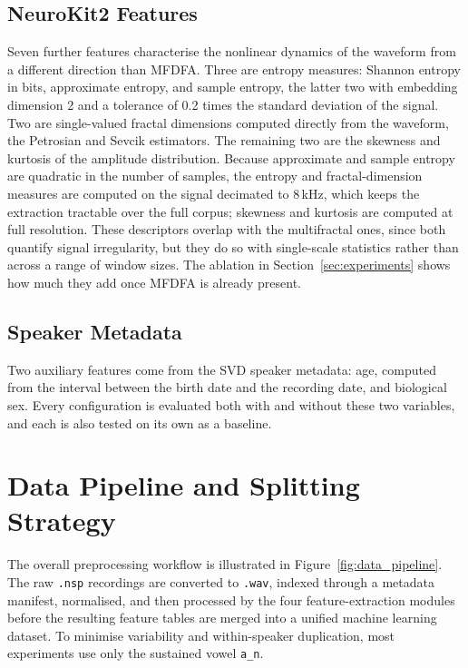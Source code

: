 \documentclass[runningheads]{llncs}
\begin{document}
  \subsection{NeuroKit2 Features}

  Seven further features characterise the nonlinear dynamics of the waveform from a different direction than MFDFA. Three are entropy measures: Shannon entropy in bits, approximate entropy, and sample entropy, the latter two with embedding dimension 2 and a tolerance of 0.2 times the standard deviation of the signal. Two are single-valued fractal dimensions computed directly from the waveform, the Petrosian and Sevcik estimators. The remaining two are the skewness and kurtosis of the amplitude distribution. Because approximate and sample entropy are quadratic in the number of samples, the entropy and fractal-dimension measures are computed on the signal decimated to 8\,kHz, which keeps the extraction tractable over the full corpus; skewness and kurtosis are computed at full resolution. These descriptors overlap with the multifractal ones, since both quantify signal irregularity, but they do so with single-scale statistics rather than across a range of window sizes. The ablation in Section~\ref{sec:experiments} shows how much they add once MFDFA is already present.

  \subsection{Speaker Metadata}

  Two auxiliary features come from the SVD speaker metadata: age, computed from the interval between the birth date and the recording date, and biological sex. Every configuration is evaluated both with and without these two variables, and each is also tested on its own as a baseline.

  \section{Data Pipeline and Splitting Strategy}
  \label{sec:pipeline}

  The overall preprocessing workflow is illustrated in Figure~\ref{fig:data_pipeline}.
  The raw \texttt{.nsp} recordings are converted to \texttt{.wav}, indexed through a metadata manifest, normalised, and then processed by the four feature-extraction modules before the resulting feature tables are merged into a unified machine learning dataset. To minimise variability and within-speaker duplication, most experiments use only the sustained vowel \texttt{a\_n}.
\end{document}
